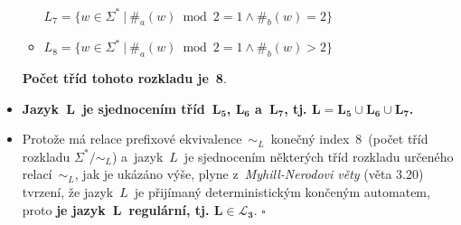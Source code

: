 \documentclass[a4paper, 11pt]{scrartcl}
\newcommand*{\QEDB}{\hfill\ensuremath{\square}}
\begin{document}
\begin{itemize}
\begin{itemize}[label=]
                    $ L_7 = \{w \in \Sigma^*\ |\ \#_a(w) \bmod 2 = 1
                    \wedge \#_b(w) = 2\} $

                \item
                    $ L_8 = \{w \in \Sigma^*\ |\ \#_a(w) \bmod 2 = 1
                    \wedge \#_b(w) > 2\} $
            \end{itemize}
            \textbf{Počet tříd tohoto rozkladu je~8}.

        \item
            \textbf{Jazyk~$ \mathbf{L} $~je sjednocením tříd~$
            \mathbf{L_5} $, $ \mathbf{L_6} $ a~$ \mathbf{L_7} $,
            tj. $ \mathbf{L = L_5 \cup L_6 \cup L_7} $.}

        \item
            Protože má relace prefixové ekvivalence~$ \sim_L $~konečný
            index~8~(počet tříd rozkladu $ \Sigma^* / \sim_L $)
            a~jazyk~$ L $~je sjednocením některých tříd rozkladu
            určeného relací~$ \sim_L $, jak je ukázáno výše, plyne
            z~\emph{Myhill-Nerodovi věty} (věta 3.20)
            tvrzení, že jazyk~$ L $~je přijímaný deterministickým
            končeným automatem, proto \textbf{je jazyk~$ \mathbf{L}
            $~regulární, tj. $ \mathbf{L \in \mathcal{L}_3} $}. \QEDB
    \end{itemize}
\end{document}
